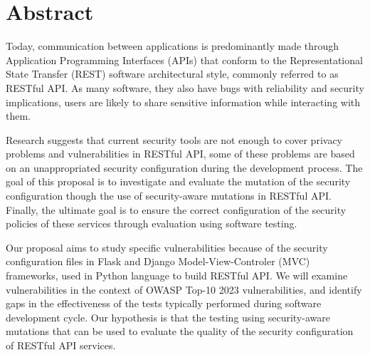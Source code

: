 \chapter*{Abstract}

Today, communication between applications is predominantly made through Application Programming Interfaces (APIs) that conform to the Representational State Transfer (REST) software architectural style, commonly referred to as RESTful API. As many software, they also have bugs with reliability and security implications, 
users are likely to share sensitive information while interacting with them.

Research suggests that current security tools are not enough to cover privacy problems and vulnerabilities in RESTful API, some of these problems are based on an unappropriated security configuration during the development process.
The goal of this proposal is to investigate and evaluate the mutation of the security configuration though the use of security-aware mutations in RESTful API. Finally, the ultimate goal is to ensure the correct configuration of the security policies of these services through evaluation using software testing.


Our proposal aims to study specific vulnerabilities because of the security configuration files in Flask and Django Model-View-Controler (MVC) frameworks, used in Python language to build RESTful API. We will examine vulnerabilities in the context of OWASP Top-10 2023 vulnerabilities, and identify gaps in the effectiveness of the tests typically performed during software development cycle.
Our hypothesis is that the testing using security-aware mutations that can be used to evaluate the quality of the security configuration of RESTful API services.
